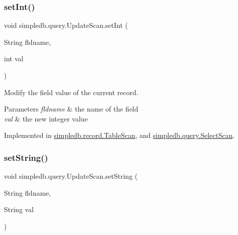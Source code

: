 \mbox{\label{interfacesimpledb_1_1query_1_1UpdateScan_ad866b1c21bbe8f0442a8779a6240c069}} 
\subsubsection{\texorpdfstring{set\+Int()}{setInt()}}
{\footnotesize\ttfamily void simpledb.\+query.\+Update\+Scan.\+set\+Int (\begin{DoxyParamCaption}\item[{String}]{fldname,  }\item[{int}]{val }\end{DoxyParamCaption})}

Modify the field value of the current record. 
\begin{DoxyParams}{Parameters}
{\em fldname} & the name of the field \\
\hline
{\em val} & the new integer value \\
\hline
\end{DoxyParams}


Implemented in \hyperlink{classsimpledb_1_1record_1_1TableScan_af36f97fd4163b889c0e3d76a824406c2}{simpledb.\+record.\+Table\+Scan}, and \hyperlink{classsimpledb_1_1query_1_1SelectScan_a1c800a9b658cc70338670412913ac614}{simpledb.\+query.\+Select\+Scan}.

\mbox{\label{interfacesimpledb_1_1query_1_1UpdateScan_a06d8414432dac908fd6c5d337e848f95}} 
\subsubsection{\texorpdfstring{set\+String()}{setString()}}
{\footnotesize\ttfamily void simpledb.\+query.\+Update\+Scan.\+set\+String (\begin{DoxyParamCaption}\item[{String}]{fldname,  }\item[{String}]{val }\end{DoxyParamCaption})}

